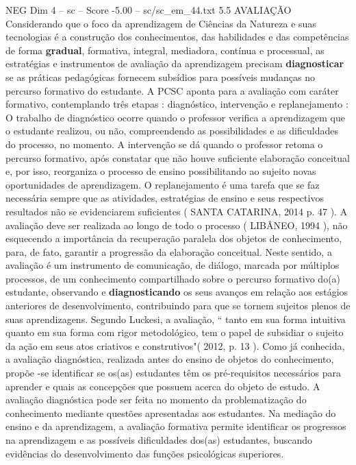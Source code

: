 \begin{textsample}{NEG Dim 4 – sc – Score -5.00 – sc/sc\_em\_44.txt}  \label{ex:f4_neg_251}
5.5 AVALIAÇÃO Considerando que o foco da aprendizagem de Ciências da Natureza e suas tecnologias é a construção dos conhecimentos, das habilidades e das competências de forma \textbf{gradual}, formativa, integral, mediadora, contínua e processual, as estratégias e instrumentos de avaliação da aprendizagem precisam \textbf{diagnosticar} se as práticas pedagógicas fornecem subsídios para possíveis mudanças no percurso formativo do estudante.
A PCSC aponta para a avaliação com caráter formativo, contemplando três etapas : diagnóstico, intervenção e replanejamento : O trabalho de diagnóstico ocorre quando o professor verifica a aprendizagem que o estudante realizou, ou não, compreendendo as possibilidades e as dificuldades do processo, no momento.
A intervenção se dá quando o professor retoma o percurso formativo, após constatar que não houve suficiente elaboração conceitual e, por isso, reorganiza o processo de ensino possibilitando ao sujeito novas oportunidades de aprendizagem.
O replanejamento é uma tarefa que se faz necessária sempre que as atividades, estratégias de ensino e seus respectivos resultados não se evidenciarem suficientes ( SANTA CATARINA, 2014 p. 47 ).
A avaliação deve ser realizada ao longo de todo o processo ( LIBÂNEO, 1994 ), não esquecendo a importância da recuperação paralela dos objetos de conhecimento, para, de fato, garantir a progressão da elaboração conceitual.
Neste sentido, a avaliação é um instrumento de comunicação, de diálogo, marcada por múltiplos processos, de um conhecimento compartilhado sobre o percurso formativo do(a) estudante, observando e \textbf{diagnosticando} os seus avanços em relação aos estágios anteriores de desenvolvimento, contribuindo para que se tornem sujeitos plenos de suas aprendizagens.
Segundo Luckesi, a avaliação, “ tanto em sua forma intuitiva quanto em sua forma com rigor metodológico, tem o papel de subsidiar o sujeito da ação em seus atos criativos e construtivos"( 2012, p. 13 ).
Como já conhecida, a avaliação diagnóstica, realizada antes do ensino de objetos do conhecimento, propõe -se identificar se os(as) estudantes têm os pré-requisitos necessários para aprender e quais as concepções que possuem acerca do objeto de estudo.
A avaliação diagnóstica pode ser feita no momento da problematização do conhecimento mediante questões apresentadas aos estudantes.
Na mediação do ensino e da aprendizagem, a avaliação formativa permite identificar os progressos na aprendizagem e as possíveis dificuldades dos(as) estudantes, buscando evidências do desenvolvimento das funções psicológicas superiores.

\end{textsample}
